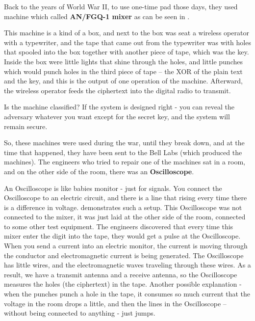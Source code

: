 Back to the years of World War II, to use one-time pad those days, they used machine which called \textbf{AN/FGQ-1 mixer}\cite{cryptoMix} as can be seen in .

This machine is a kind of a box, and next to the box was seat a wireless operator with a typewriter, and the tape that came out from the typewriter was with holes that spooled into the box together with another piece of tape, which was the key. Inside the box were little lights that shine through the holes, and little punches which would punch holes in the third piece of tape – the XOR of the plain text and the key, and this is the output of one operation of the machine. Afterward, the wireless operator feeds the ciphertext into the digital radio to transmit.

Is the machine classified? If the system is designed right - you can reveal the adversary whatever you want except for the secret key, and the system will remain secure.

So, these machines were used during the war, until they break down, and at the time that happened, they have been sent to the Bell Labs (which produced the machines). The engineers who tried to repair one of the machines sat in a room, and on the other side of the room, there was an \textbf{Oscilloscope}. 

An Oscilloscope is like babies monitor - just for signals. You connect the Oscilloscope to an electric circuit, and there is a line that rising every time there is a difference in voltage.  demonstrates such a setup.
This Oscilloscope was not connected to the mixer, it was just laid at the other side of the room, connected to some other test equipment. The engineers discovered that every time this mixer enter the digit into the tape, they would get a pulse at the Oscilloscope. When you send a current into an electric monitor, the current is moving through the conductor and electromagnetic current is being generated. The Oscilloscope has little wires, and the electromagnetic waves traveling through these wires. As a result, we have a transmit antenna and a receive antenna, so the Oscilloscope measures the holes (the ciphertext) in the tape. Another possible explanation - when the punches punch a hole in the tape, it consumes so much current that the voltage in the room drops a little, and then the lines in the Oscilloscope – without being connected to anything -  just jumps.

